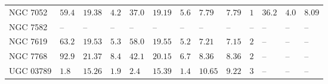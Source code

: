 \begin{table*}
\begin{center}
\begin{tabular}{lllllllllllll}
NGC 7052  \quad &  $59.4$  &  $19.38$  &  $4.2$  \quad \quad &  $37.0$  &  $19.19$  &  $5.6$  &  $7.79$  &  $7.79$  \quad \quad &  $1$  \quad \quad &  $36.2$  &  $4.0$  &  $8.09$  \\ 
NGC 7582  \quad &   -- &   -- &   -- \quad \quad &   -- &   -- &   -- &   -- &   -- \quad \quad & 
 -- \quad \quad & 
 -- &   -- &   --    \\ 
NGC 7619  \quad &  $63.2$  &  $19.53$  &  $5.3$  \quad \quad &  $58.0$  &  $19.55$  &  $5.2$  &  $7.21$  &  $7.15$  \quad \quad &  $2$  \quad \quad &   -- &   -- &   --    \\ 
NGC 7768  \quad &  $92.9$  &  $21.37$  &  $8.4$  \quad \quad &  $42.1$  &  $20.15$  &  $6.7$  &  $8.36$  &  $8.36$  \quad \quad &  $2$  \quad \quad &   -- &   -- &   --    \\ 
UGC 03789  \quad &  $1.8$  &  $15.26$  &  $1.9$  \quad \quad &  $2.4$  &  $15.39$  &  $1.4$  &  $10.65$  &  $9.22$  \quad \quad &  $3$  \quad \quad &   -- &   -- &   --    \\ 
\hline         
\end{tabular}   
\end{center}    
\end{table*}    

